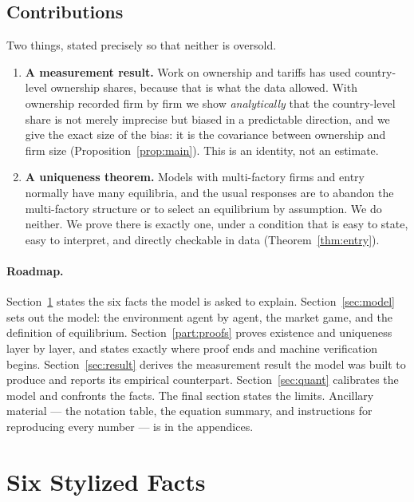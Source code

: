 \documentclass[11pt]{article}
\theoremstyle{plain}
\theoremstyle{remark}
\theoremstyle{definition}
\begin{document}
\subsection{Contributions}

Two things, stated precisely so that neither is oversold.

\begin{enumerate}
\item \textbf{A measurement result.} Work on ownership and tariffs has used
country-level ownership shares, because that is what the data allowed. With ownership
recorded firm by firm we show \emph{analytically} that the country-level share is not
merely imprecise but biased in a predictable direction, and we give the exact size of
the bias: it is the covariance between ownership and firm size
(Proposition~\ref{prop:main}). This is an identity, not an estimate.
\item \textbf{A uniqueness theorem.} Models with multi-factory firms and entry
normally have many equilibria, and the usual responses are to abandon the multi-factory
structure or to select an equilibrium by assumption. We do neither. We prove there is
exactly one, under a condition that is easy to state, easy to interpret, and directly
checkable in data (Theorem~\ref{thm:entry}).
\end{enumerate}

\paragraph{Roadmap.} Section~\ref{sec:factsstate} states the six facts the model is
asked to explain. Section~\ref{sec:model} sets out the model: the environment agent
by agent, the market game, and the definition of equilibrium.
Section~\ref{part:proofs} proves existence and uniqueness layer by layer, and states
exactly where proof ends and machine verification begins.
Section~\ref{sec:result} derives the measurement result the model was built to
produce and reports its empirical counterpart. Section~\ref{sec:quant} calibrates
the model and confronts the facts. The final section states the limits. Ancillary
material --- the notation table, the equation summary, and instructions for
reproducing every number --- is in the appendices.

\newpage
\section{Six Stylized Facts}
\label{sec:factsstate}
\label{sec:facts}
\end{document}
